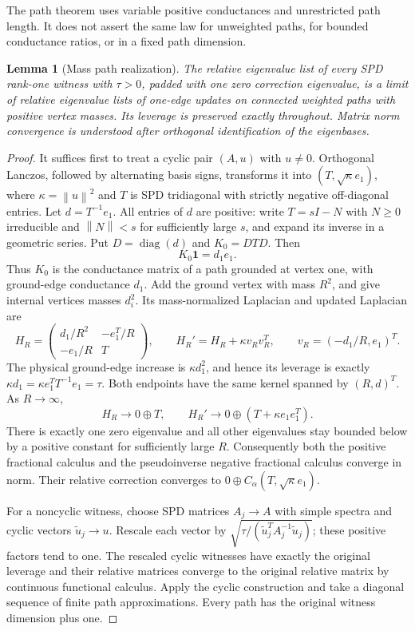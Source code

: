\documentclass[11pt]{article}
\newtheorem{lemma}[theorem]{Lemma}
\newcommand{\norm}[1]{\left\lVert#1\right\rVert}
\newcommand{\diag}{\operatorname{diag}}
\begin{document}
The path theorem uses variable positive conductances and unrestricted
path length. It does not assert the same law for unweighted paths, for
bounded conductance ratios, or in a fixed path dimension.

\begin{lemma}[Mass path realization]\label{lem:masspath}
The relative eigenvalue list of every SPD rank-one witness with
$\tau>0$, padded with one zero correction eigenvalue, is a limit of
relative eigenvalue lists of one-edge updates on connected weighted
paths with positive vertex masses. Its leverage is preserved exactly
throughout. Matrix norm convergence is understood after orthogonal
identification of the eigenbases.
\end{lemma}
\begin{proof}
It suffices first to treat a cyclic pair $(A,u)$ with $u\ne0$.
Orthogonal Lanczos, followed by alternating basis signs, transforms it
into $(T,\sqrt\kappa e_1)$, where $\kappa=\norm u^2$ and $T$ is SPD
tridiagonal with strictly negative off-diagonal entries.
Let $d=T^{-1}e_1$. All entries of $d$ are positive: write
$T=sI-N$ with $N\ge0$ irreducible and $\norm N<s$ for sufficiently
large $s$, and expand its inverse in a geometric series. Put
$D=\diag(d)$ and $K_0=DTD$. Then
\[
 K_0\mathbf1=d_1e_1.
\]
Thus $K_0$ is the conductance matrix of a path grounded at vertex one,
with ground-edge conductance $d_1$. Add the ground vertex with mass
$R^2$, and give internal vertices masses $d_i^2$. Its mass-normalized
Laplacian and updated Laplacian are
\[
 H_R=\begin{pmatrix}d_1/R^2&-e_1^T/R\\-e_1/R&T\end{pmatrix},
 \qquad H_R'=H_R+\kappa v_Rv_R^T,
 \qquad v_R=(-d_1/R,e_1)^T.
\]
The physical ground-edge increase is $\kappa d_1^2$, and hence its
leverage is exactly $\kappa d_1=\kappa e_1^TT^{-1}e_1=\tau$.
Both endpoints have the same kernel spanned by $(R,d)^T$.
As $R\to\infty$,
\[
 H_R\to0\oplus T,\qquad
 H_R'\to0\oplus(T+\kappa e_1e_1^T).
\]
There is exactly one zero eigenvalue and all other eigenvalues stay
bounded below by a positive constant for sufficiently large $R$.
Consequently both the positive fractional calculus and the
pseudoinverse negative fractional calculus converge in norm. Their
relative correction converges to $0\oplus C_\alpha(T,\sqrt\kappa e_1)$.

For a noncyclic witness, choose SPD matrices $A_j\to A$ with simple
spectra and cyclic vectors $\widetilde u_j\to u$. Rescale each vector
by $\sqrt{\tau/(\widetilde u_j^TA_j^{-1}\widetilde u_j)}$; these
positive factors tend to one. The rescaled cyclic witnesses have
exactly the original leverage and their relative matrices converge to
the original relative matrix by continuous functional calculus.
Apply the cyclic construction and take a diagonal sequence of finite
path approximations. Every path has the original witness dimension
plus one.
\end{proof}
\end{document}

